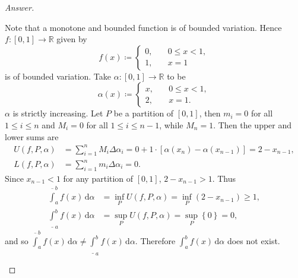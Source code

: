 \documentclass[12pt]{article}
\newcommand{\real}{\mathbb{R}}
\newcommand\paren[1]{\left( #1 \right)}
\newcommand\setb[1]{\left \{ #1 \right \}}
\newcommand{\sqbrack}[1]{\left [ #1 \right ]}
\theoremstyle{definition}
\begin{document}
\begin{proof}[Answer]
\begin{enumerate}[a.]
        Note that a monotone and bounded function is of bounded variation. Hence $f : [0,1] \to \real$ given by 
        \[
            f(x) \coloneqq 
            \begin{cases}
                0 , & \quad 0 \leq x < 1, \\
                1 , & \quad x = 1
            \end{cases}
        \]
        is of bounded variation. Take $\alpha : [0,1] \to \real$ to be
        \[
            \alpha(x) \coloneqq 
            \begin{cases}
                x , & \quad 0 \leq x < 1, \\
                2 , & \quad x = 1.
            \end{cases}
        \]
        $\alpha$ is strictly increasing. Let $P$ be a partition of $[0,1]$, then $m_i = 0$ for all $1 \leq i \leq n$ and $M_i = 0$ for all $1 \leq i \leq n-1$, while $M_n = 1$. Then the upper and lower sums are
        \begin{align*}
            U(f,P,\alpha) & = \sum\limits_{i = 1}^n M_i \Delta \alpha_i = 0 + 1 \cdot \sqbrack{ \alpha \paren{ x_n } - \alpha \paren{ x_{n-1} } }  = 2 - x_{n-1} , \\
            L(f,P,\alpha) & = \sum\limits_{i = 1}^n m_i \Delta \alpha_i = 0.
        \end{align*}
        Since $x_{n-1} < 1$ for any partition of $[0,1]$, $2 - x_{n-1} > 1$. Thus 
        \begin{align*}
            \overline{\int}_a^b f(x) \, \mathrm{d}\alpha & = \inf\limits_{P} U(f,P,\alpha) = \inf\limits_{P} \paren{ 2 - x_{n-1} } \geq 1, \\
            \underline{\int}_a^b f(x) \, \mathrm{d}\alpha & = \sup\limits_{P} U(f,P,\alpha) = \sup\limits_{P} \setb{ 0 } = 0,
        \end{align*}
        and so $\overline{\int}_a^b f(x) \, \mathrm{d}\alpha \neq \underline{\int}_a^b f(x) \, \mathrm{d}\alpha$. Therefore $\int_a^b f(x) \, \mathrm{d}\alpha$ does not exist.
    \end{enumerate}
\end{proof}
\end{document}

